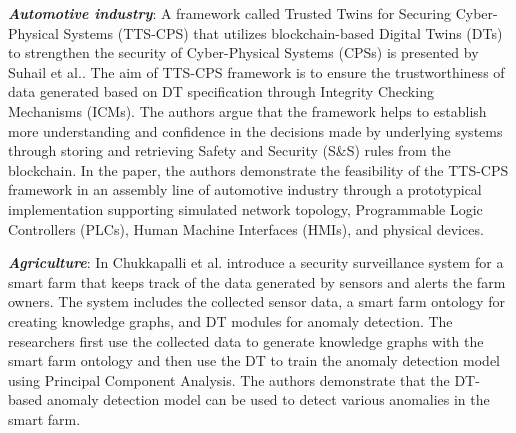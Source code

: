 \textbf{\textit{Automotive industry}}: A framework called Trusted Twins for Securing Cyber-Physical Systems (TTS-CPS) that utilizes blockchain-based Digital Twins (DTs) to strengthen the security of Cyber-Physical Systems (CPSs) is presented by Suhail et al.\cite{suhailSituationalAwareCyberphysical2022}. The aim of TTS-CPS framework is to ensure the trustworthiness of data generated based on DT specification through Integrity Checking Mechanisms (ICMs). The authors argue that the framework helps to establish more understanding and confidence in the decisions made by underlying systems through storing and retrieving Safety and Security (S\&S) rules from the blockchain. In the paper, the authors demonstrate the feasibility of the TTS-CPS framework in an assembly line of automotive industry through a prototypical implementation supporting simulated network topology, Programmable Logic Controllers (PLCs), Human Machine Interfaces (HMIs), and physical devices. 

\textbf{\textit{Agriculture}}: In\cite{chukkapalliCyberPhysicalSystemSecurity2021} Chukkapalli et al. introduce a security surveillance system for a smart farm that keeps track of the data generated by sensors and alerts the farm owners. The system includes the collected sensor data, a smart farm ontology for creating knowledge graphs, and DT modules for anomaly detection. The researchers first use the collected data to generate knowledge graphs with the smart farm ontology and then use the DT to train the anomaly detection model using Principal Component Analysis. The authors demonstrate that the DT-based anomaly detection model can be used to detect various anomalies in the smart farm.
